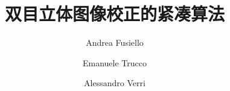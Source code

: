 \documentclass[UTF8,a4paper,zihao=-4,fontset=fandol]{ctexart}
\title{双目立体图像校正的紧凑算法}
\author{Andrea Fusiello \and Emanuele Trucco \and Alessandro Verri}
\date{}
\makeatletter
\def@path{{}{task1/}}
\makeatother
\begin{document}
\maketitle












\makeatletter
\begingroup
    {\gdef\bibfilepath{references}}
    {\gdef\bibfilepath{task1/references}}
\endgroup
\makeatother

\end{document}
